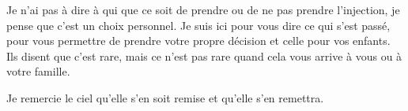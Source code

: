 Je n'ai pas à dire à qui que ce soit de prendre ou de ne pas prendre
l'injection, je pense que c'est un choix personnel. Je suis ici pour vous dire
ce qui s'est passé, pour vous permettre de prendre votre propre décision et
celle pour vos enfants. Ils disent que c'est rare, mais ce n'est pas rare quand
cela vous arrive à vous ou à votre famille.

Je remercie le ciel qu'elle s'en soit remise et qu'elle s'en remettra.

